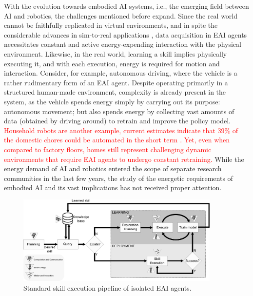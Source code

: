 With the evolution towards embodied AI systems, i.e., the emerging field between AI and robotics, the challenges mentioned before expand. Since the real world cannot be faithfully replicated in virtual environments, and in spite the considerable advances in sim-to-real applications \cite{Chebotar2019Closingsimreal}, data acquisition in EAI agents necessitates constant and active energy-expending interaction with the physical environment. Likewise, in the real world, learning a skill implies physically executing it, and with each execution, energy is required for motion and interaction. Consider, for example, autonomous driving, where the vehicle is a rather rudimentary form of an EAI agent. Despite operating primarily in a structured human-made environment, complexity is already present in the system, as the vehicle spends energy simply by carrying out its purpose: autonomous movement; but also spends energy by collecting vast amounts of data (obtained by driving around) to retrain and improve the policy model. \textcolor{red}{Household robots are another example, current estimates indicate that 39\% of the domestic chores could be automated in the short term \cite{Lehdonvirta2022futuresunpaidwork}. Yet, even when compared to factory floors, homes still represent challenging dynamic environments that require EAI agents to undergo constant retraining.} While the energy demand of AI and robotics entered the scope of separate research communities in the last few years, the study of the energetic requirements of embodied AI and its vast implications has not received proper attention. 
\begin{figure}[!t]
	\centering
	\includegraphics[width=0.9\textwidth]{fig/embodied_ai_learning_pipeline_v7.pdf}
	\caption{Standard skill execution pipeline of isolated EAI agents.}
	\label{fig:embodied_ai_pipeline}
\end{figure}
